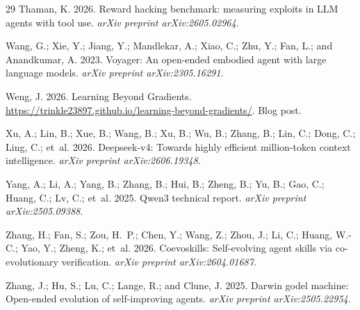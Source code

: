 \documentclass[letterpaper]{article} \usepackage{aaai2027}  \usepackage[hyphens]{url}  \usepackage{graphicx} \urlstyle{rm} \def\UrlFont{\rm}  \usepackage{natbib}  \usepackage{caption} \usepackage{amsfonts} \usepackage{multirow} \frenchspacing  \usepackage{algorithm}
\begin{document}
\begin{thebibliography}{29}
Thaman, K. 2026.
\newblock Reward hacking benchmark: measuring exploits in LLM agents with tool
  use.
\newblock \emph{arXiv preprint arXiv:2605.02964}.

Wang, G.; Xie, Y.; Jiang, Y.; Mandlekar, A.; Xiao, C.; Zhu, Y.; Fan, L.; and
  Anandkumar, A. 2023.
\newblock Voyager: An open-ended embodied agent with large language models.
\newblock \emph{arXiv preprint arXiv:2305.16291}.

Weng, J. 2026.
\newblock Learning Beyond Gradients.
\newblock \url{https://trinkle23897.github.io/learning-beyond-gradients/}.
\newblock Blog post.

Xu, A.; Lin, B.; Xue, B.; Wang, B.; Xu, B.; Wu, B.; Zhang, B.; Lin, C.; Dong,
  C.; Ling, C.; et~al. 2026.
\newblock Deepseek-v4: Towards highly efficient million-token context
  intelligence.
\newblock \emph{arXiv preprint arXiv:2606.19348}.

Yang, A.; Li, A.; Yang, B.; Zhang, B.; Hui, B.; Zheng, B.; Yu, B.; Gao, C.;
  Huang, C.; Lv, C.; et~al. 2025.
\newblock Qwen3 technical report.
\newblock \emph{arXiv preprint arXiv:2505.09388}.

Zhang, H.; Fan, S.; Zou, H.~P.; Chen, Y.; Wang, Z.; Zhou, J.; Li, C.; Huang,
  W.-C.; Yao, Y.; Zheng, K.; et~al. 2026.
\newblock Coevoskills: Self-evolving agent skills via co-evolutionary
  verification.
\newblock \emph{arXiv preprint arXiv:2604.01687}.

Zhang, J.; Hu, S.; Lu, C.; Lange, R.; and Clune, J. 2025.
\newblock Darwin godel machine: Open-ended evolution of self-improving agents.
\newblock \emph{arXiv preprint arXiv:2505.22954}.

\end{thebibliography}
 
\end{document}

